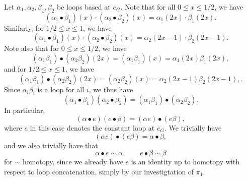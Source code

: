 \documentclass[11pt, letterpaper]{article}
\begin{document}
Let $\alpha _1,\alpha _2,\beta _1,\beta _2$ be loops based at $e_G$. Note that for all $0\leq x\leq 1/2$, we have
\[
	(\alpha _1\bullet \beta _1)(x)\cdot (\alpha _2\bullet \beta _2)(x)=\alpha _1(2x)\cdot \beta _1(2x)
.\]
Similarly, for $1/2\leq x\leq 1$, we have
\[
	(\alpha _1\bullet \beta _1)(x)\cdot (\alpha _2\bullet \beta _2)(x)=\alpha _2(2x-1)\cdot \beta _2(2x-1)
.\]
Note also that for $0\leq x\leq 1/2$, we have
\[
	(\alpha _1\beta _1)\bullet (\alpha _2\beta _2)(2x)=(\alpha _1\beta _1)(x)=\alpha _1(2x)\beta _1(2x),
\]
and for $1/2\leq x\leq 1$, we have
\[
	(\alpha _1\beta _1)\bullet (\alpha _2\beta _2)(2x)=(\alpha _2\beta _2)(x)=\alpha _2(2x-1)\beta _2(2x-1),
.\]
Since $\alpha _i\beta _i$ is a loop for all $i$, we thus have
\[
	(\alpha _1\bullet\beta _1)(\alpha _2\bullet \beta _2)=(\alpha _1\beta _1)\bullet(\alpha _2\beta _2).
\]
In particular,
\[
	(\alpha \bullet e )(e \bullet \beta )=(\alpha e )\bullet (e \beta ),
\]
where $e$ in this case denotes the constant loop at $e_G$. We trivially have
\[
	(\alpha e)\bullet (e\beta )=\alpha \bullet \beta ,
\]
and we also trivially have that
\[
	\alpha \bullet e\sim \alpha ,\qquad e\bullet \beta \sim \beta 
\]
for $\sim $ homotopy, since we already have $e$ is an identity up to homotopy with respect to loop concatenation, simply by our investigtation of $\pi _1$.
\end{document}
